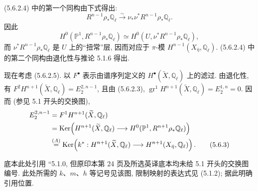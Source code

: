 (5.6.2.4) 中的第一个同构由下式得出:
\[
R^{n-1}\rho_*\mathbb Q_\ell
\overset{\sim}{\longrightarrow}
\nu_*\nu^*R^{n-1}\rho_*\mathbb Q_\ell.
\]
因此
\[
H^0(\mathbb P^1,R^{n-1}\rho_*\mathbb Q_\ell)
\simeq
H^0(U,\nu^*R^{n-1}\rho_*\mathbb Q_\ell),
\]
而 $\nu^*R^{n-1}\rho_*\mathbb Q_\ell$ 是 $U$ 上的\textquotedblleft 扭常\textquotedblright{}层, 因而对应于 $\pi$-模 $H^{n-1}(X_{\bar\eta},\mathbb Q_\ell)$. (5.6.2.4) 中的第二个同构由退化性与推论 5.1.6 得出.

现在考虑 (5.6.2.5). 以 $F^\bullet$ 表示由谱序列定义的 $H^\bullet(\widetilde X,\mathbb Q_\ell)$ 上的滤过. 由退化性, 有 $F^2H^{n+1}(\widetilde X,\mathbb Q_\ell)=E_2^{2,n-1}$, 且由 (5.6.2.3), $\operatorname{gr}^1H^{n+1}(\widetilde X,\mathbb Q_\ell)=E_2^{1,n}=0$. 因而 (参见 5.1 开头的交换图),
\begin{align}
E_2^{2,n-1}
 &=F^1H^{n+1}(\widetilde X,\mathbb Q_\ell) \notag\\
 &=\operatorname{Ker}\!\left(
 H^{n+1}(\widetilde X,\mathbb Q_\ell)
 \longrightarrow H^0(\mathbb P^1,R^{n+1}\rho_*\mathbb Q_\ell)
 \right) \notag\\
 &\overset{(A)}{=}
 \operatorname{Ker}\!\left(
 k^*:H^{n+1}(\widetilde X,\mathbb Q_\ell)
 \longrightarrow H^{n+1}(X_{\bar\eta},\mathbb Q_\ell)
 \right).
\tag{5.6.3}
\end{align}
\begin{editorialnote}
底本此处引用 ``5.1.0, 但原印本第 24 页及所选英译底本均未给 5.1 开头的交换图编号. 此处所需的 $k$、$m$、$h$ 等记号见该图, 限制映射的表达式见 (5.1.2); 据此明确引用位置.
\end{editorialnote}

